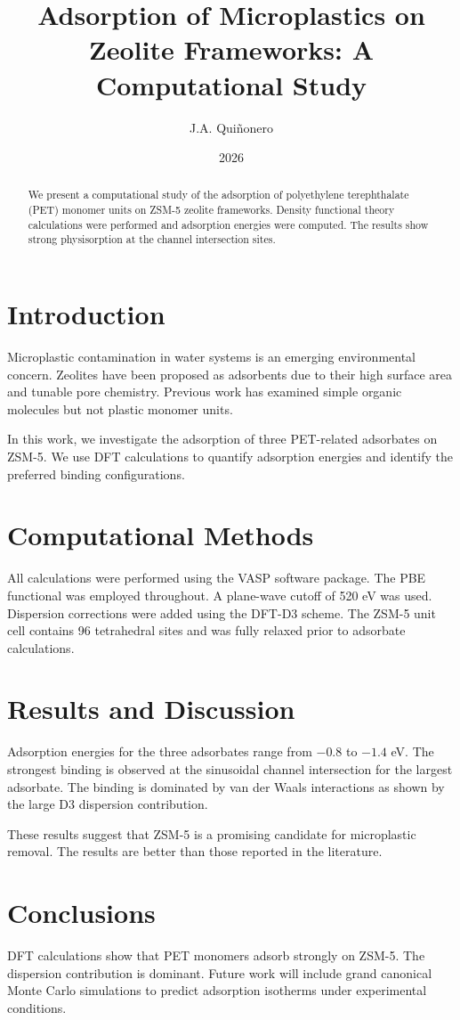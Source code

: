 \documentclass[12pt]{article}
\title{Adsorption of Microplastics on Zeolite Frameworks: A Computational Study}
\author{J.A. Quiñonero}
\date{2026}
\begin{document}
\maketitle

\begin{abstract}
We present a computational study of the adsorption of polyethylene terephthalate (PET)
monomer units on ZSM-5 zeolite frameworks. Density functional theory calculations were
performed and adsorption energies were computed. The results show strong physisorption
at the channel intersection sites.
\end{abstract}

\section{Introduction}

Microplastic contamination in water systems is an emerging environmental concern.
Zeolites have been proposed as adsorbents due to their high surface area and tunable
pore chemistry. Previous work has examined simple organic molecules but not plastic
monomer units.

In this work, we investigate the adsorption of three PET-related adsorbates on ZSM-5.
We use DFT calculations to quantify adsorption energies and identify the preferred
binding configurations.

\section{Computational Methods}

All calculations were performed using the VASP software package.
The PBE functional was employed throughout. A plane-wave cutoff of 520 eV was used.
Dispersion corrections were added using the DFT-D3 scheme.
The ZSM-5 unit cell contains 96 tetrahedral sites and was fully relaxed prior to
adsorbate calculations.

\section{Results and Discussion}

Adsorption energies for the three adsorbates range from $-0.8$ to $-1.4$ eV.
The strongest binding is observed at the sinusoidal channel intersection for the
largest adsorbate. The binding is dominated by van der Waals interactions as shown
by the large D3 dispersion contribution.

These results suggest that ZSM-5 is a promising candidate for microplastic removal.
The results are better than those reported in the literature.

\section{Conclusions}

DFT calculations show that PET monomers adsorb strongly on ZSM-5.
The dispersion contribution is dominant.
Future work will include grand canonical Monte Carlo simulations to predict
adsorption isotherms under experimental conditions.
\end{document}
